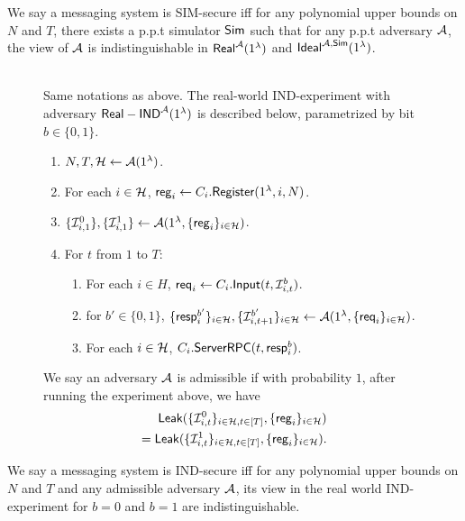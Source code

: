 \begin{definition}
\label{defn:SIM-secure}
We say a messaging system is SIM-secure iff for  any polynomial upper bounds on $N$ and $T$, there exists a p.p.t simulator $\mathsf{Sim}$ such that for any p.p.t adversary $\mathcal{A}$, the view of $\mathcal{A}$ is indistinguishable in $\mathsf{Real}^{\mathcal{A}}(1^{\lambda})$ and $\mathsf{Ideal}^{\mathcal{A}, \mathsf{\mathsf{Sim}}}(1^{\lambda})$.
\end{definition}


\begin{figure}
\begin{framed}
\begin{definition} \hfill\\
\label{defn:asphr-ind-real-world}
Same notations as above. The real-world IND-experiment with adversary $\mathsf{Real-IND}^{\mathcal{A}}(1^{\lambda})$ is described below, parametrized by bit $b \in \{0, 1\}$.
\begin{enumerate}
\item $N, T, \mathcal{H} \leftarrow \mathcal{A}(1^{\lambda})$.
\item For each $i \in \mathcal{H}$, $\mathsf{reg}_i \leftarrow C_i.\mathsf{Register}(1^{\lambda}, i, N)$. 
\item $\{\mathcal{I}^{0}_{i, 1}\}, \{\mathcal{I}^{1}_{i, 1}\} \leftarrow \mathcal{A}(1^{\lambda}, \{\mathsf{reg}_i\}_{i \in \mathcal{H}})$.
\item For $t$ from $1$ to $T$:
    \begin{enumerate}
    \item For each $i \in H$, $\mathsf{req}_i \leftarrow C_i.\mathsf{Input}(t, \mathcal{I}^{b}_{i, t})$.
    
    \item for $b'\in \{0, 1\}$, $\{\mathsf{resp}^{b'}_i\}_{i \in \mathcal{H}},\{\mathcal{I}^{b'}_{i, t + 1}\}_{i \in \mathcal{H}} \leftarrow \mathcal{A}(1^{\lambda}, \{\mathsf{req}_i\}_{i \in \mathcal{H}})$.
    
    \item For each $i \in \mathcal{H}$, $C_i.\mathsf{ServerRPC}(t, \mathsf{resp}^{b}_i)$.
    \end{enumerate}
\end{enumerate}
We say an adversary $\mathcal{A}$ is admissible if with probability $1$, after running the experiment above, we have
\begin{align*}
\mathsf{Leak}(\{\mathcal{I}^{0}_{i, t}\}_{i \in \mathcal{H}, t \in [T]}, \{\mathsf{reg}_i\}_{i \in \mathcal{H}}) \\
= \mathsf{Leak}(\{\mathcal{I}^{1}_{i, t}\}_{i \in \mathcal{H}, t \in [T]}, \{\mathsf{reg}_i\}_{i \in \mathcal{H}}).    
\end{align*}
\end{definition}
\end{framed}
\end{figure}
\begin{definition}
We say a messaging system is IND-secure iff for any polynomial upper bounds on $N$ and $T$ and any admissible adversary $\mathcal{A}$, its view in the real world IND-experiment for $b = 0$ and $b = 1$ are indistinguishable.
\end{definition}

